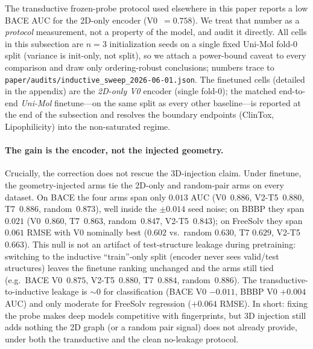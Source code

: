 \documentclass[sigconf,nonacm,anonymous,review]{acmart}
\begin{document}
The transductive frozen-probe protocol used elsewhere in this paper reports
a low BACE AUC for the 2D-only encoder (V0~$=0.758$). We treat that number
as a \emph{protocol} measurement, not a property of the model, and audit it
directly. All cells in this subsection are $n{=}3$ initialization seeds on a
single fixed Uni-Mol fold-0 split (variance is init-only, not split), so we
attach a power-bound caveat to every comparison and draw only
ordering-robust conclusions; numbers trace to
\texttt{paper/audits/inductive\_sweep\_2026-06-01.json}. The finetuned cells
(detailed in the appendix) are the \emph{2D-only V0} encoder
(single fold-0); the matched end-to-end \emph{Uni-Mol} finetune---on the same
split as every other baseline---is reported at the end of the subsection and
resolves the boundary endpoints (ClinTox, Lipophilicity) into the
non-saturated regime.

\paragraph{The gain is the encoder, not the injected geometry.}
Crucially, the correction does not rescue the 3D-injection claim. Under
finetune, the geometry-injected arms tie the 2D-only and random-pair arms on
every dataset. On BACE the four arms span only $0.013$ AUC
(V0~$0.886$, V2-T5~$0.880$, T7~$0.886$, random~$0.873$), well inside the
$\pm0.014$ seed noise; on BBBP they span $0.021$ (V0~$0.860$, T7~$0.863$,
random~$0.847$, V2-T5~$0.843$); on FreeSolv they span $0.061$ RMSE with V0
nominally best ($0.602$ vs.\ random $0.630$, T7 $0.629$, V2-T5 $0.663$).
This null is not an artifact of test-structure leakage during pretraining:
switching to the inductive ``train''-only split (encoder never sees
valid/test structures) leaves the finetune ranking unchanged and the arms
still tied (e.g.\ BACE V0~$0.875$, V2-T5~$0.880$, T7~$0.884$,
random~$0.886$). The transductive-to-inductive leakage is $\sim$0 for
classification (BACE V0 $-0.011$, BBBP V0 $+0.004$ AUC) and only moderate
for FreeSolv regression ($+0.064$ RMSE). In short: fixing the probe makes
deep models competitive with fingerprints, but 3D injection still adds
nothing the 2D graph (or a random pair signal) does not already provide,
under both the transductive and the clean no-leakage protocol.
\end{document}
